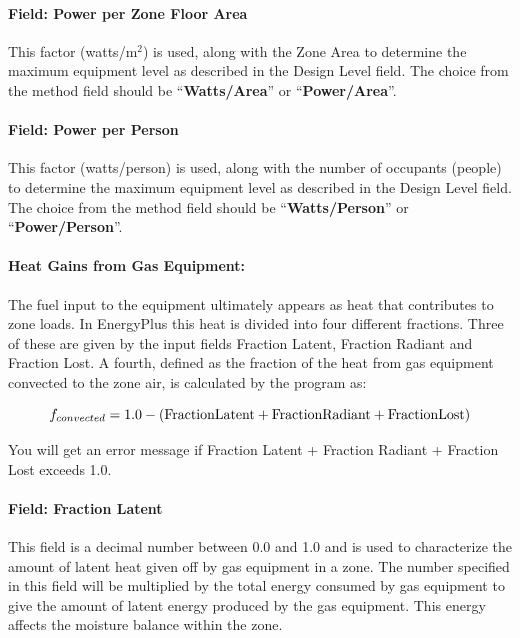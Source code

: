 \paragraph{Field: Power per Zone Floor Area}\label{field-power-per-zone-floor-area}

This factor (watts/m\(^{2}\)) is used, along with the Zone Area to determine the maximum equipment level as described in the Design Level field. The choice from the method field should be ``\textbf{Watts/Area}'' or ``\textbf{Power/Area}''.

\paragraph{Field: Power per Person}\label{field-power-per-person}

This factor (watts/person) is used, along with the number of occupants (people) to determine the maximum equipment level as described in the Design Level field. The choice from the method field should be ``\textbf{Watts/Person}'' or ``\textbf{Power/Person}''.

\paragraph{Heat Gains from Gas Equipment:}\label{heat-gains-from-gas-equipment}

The fuel input to the equipment ultimately appears as heat that contributes to zone loads. In EnergyPlus this heat is divided into four different fractions. Three of these are given by the input fields Fraction Latent, Fraction Radiant and Fraction Lost. A fourth, defined as the fraction of the heat from gas equipment convected to the zone air, is calculated by the program as:

\begin{equation}
  f_{convected} = 1.0 - (\rm{Fraction Latent} + \rm{Fraction Radiant} + \rm{Fraction Lost})
\end{equation}

You will get an error message if Fraction Latent + Fraction Radiant + Fraction Lost exceeds 1.0.

\paragraph{Field: Fraction Latent}\label{field-fraction-latent-1}

This field is a decimal number between 0.0 and 1.0 and is used to characterize the amount of latent heat given off by gas equipment in a zone. The number specified in this field will be multiplied by the total energy consumed by gas equipment to give the amount of latent energy produced by the gas equipment. This energy affects the moisture balance within the zone.

